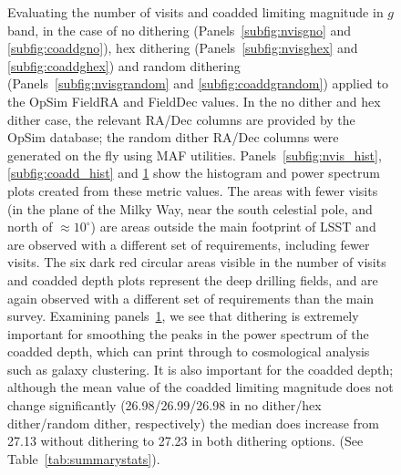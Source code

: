 \documentclass[]{spie}  %
\begin{document}
\begin{figure}
\begin{subfigure}[]{0.3\textwidth}
\caption[]{}
\label{subfig:coadd_ps}
\end{subfigure}
\caption[]
{\label{fig:dither_nvis_coadd}
Evaluating the number of visits and coadded limiting magnitude in $g$
band, in the case of no dithering (Panels~\ref{subfig:nvisgno} and
\ref{subfig:coaddgno}), hex dithering (Panels~\ref{subfig:nvisghex}
and \ref{subfig:coaddghex}) and random dithering
(Panels~\ref{subfig:nvisgrandom} and \ref{subfig:coaddgrandom})
applied to the OpSim FieldRA and FieldDec values. In the no dither and
hex dither case, the relevant RA/Dec columns are provided by the OpSim
database; the random dither RA/Dec columns were generated on the fly
using MAF utilities. Panels~\ref{subfig:nvis_hist},
\ref{subfig:coadd_hist} and \ref{subfig:coadd_ps} show the histogram
and power spectrum plots created from these metric values. The areas
with fewer visits (in the plane of the Milky Way, near the south
celestial pole, and north of
$\approx 10^{\circ}$) are areas
outside the main footprint of LSST and are observed with a different
set of requirements, including fewer visits. The six dark red circular
areas visible in the number of visits and coadded depth plots
represent the deep drilling fields, and are again observed with a
different set of requirements than the main survey. Examining
panels~\ref{subfig:coadd_ps}, we see that dithering
is extremely important for smoothing the peaks in the power spectrum
of the coadded depth, which can print through to cosmological analysis
such as galaxy clustering. It is also important for the coadded depth;
although the mean value of the coadded limiting magnitude does not
change significantly (26.98/26.99/26.98 in no dither/hex dither/random
dither, respectively) the median does increase from 27.13 without
dithering to 27.23 in both dithering options. (See Table~\ref{tab:summarystats}).}
\end{figure}
\end{document}
